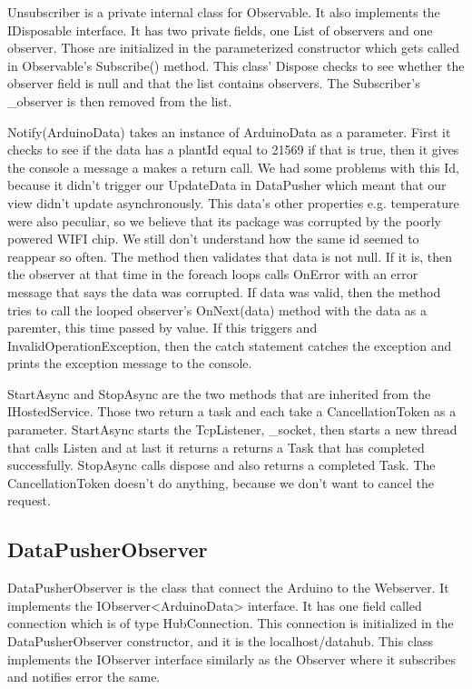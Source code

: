 \documentclass[a4paper,12pt,oneside,openright,titlepage]{book}
\begin{document}
Unsubscriber is a private internal class for Observable. It also implements the IDisposable interface.  It has two private fields, one List of observers and one observer. Those are initialized in the parameterized constructor which gets called in Observable's Subscribe() method. This class' Dispose checks to see whether the observer field is null and that the list contains observers. The Subscriber's \_observer is then removed from the list.

Notify(ArduinoData) takes an instance of ArduinoData as a parameter. First it checks to see if the data has a plantId equal to 21569 if that is true, then it gives the console a message a makes a return call. We had some problems with this Id, because it didn't trigger our UpdateData in DataPusher which meant that our view didn't update asynchronously. This data's other properties e.g. temperature were also peculiar, so we believe that its package was corrupted by the poorly powered WIFI chip. We still don't understand how the same id seemed to reappear so often. 
The method then validates that data is not null. If it is, then the observer at that time in the foreach loops calls OnError with an error message that says the data was corrupted. If data was valid, then the method tries to call the looped observer's OnNext(data) method with the data as a paremter, this time passed by value. If this triggers and InvalidOperationException, then the catch statement catches the exception and prints the exception message to the console. 

StartAsync and StopAsync are the two methods that are inherited from the IHostedService. Those two return a task and each take a CancellationToken as a parameter. StartAsync starts the TcpListener, \_socket, then starts a new thread that calls Listen and at last it returns a returns a Task that has completed successfully. StopAsync calls dispose and also returns a completed Task. The CancellationToken doesn't do anything, because we don't want to cancel the request.


\subsection{DataPusherObserver}

DataPusherObserver is the class that connect the Arduino to the Webserver. It implements the IObserver<ArduinoData> interface. It has one field called connection which is of type HubConnection. This connection is initialized in the DataPusherObserver constructor, and it is the localhost/datahub. This class implements the IObserver interface similarly as the Observer where it subscribes and notifies error the same.
\end{document}
